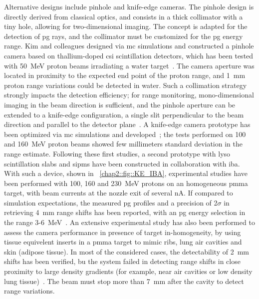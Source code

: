 Alternative designs include pinhole and knife-edge cameras. The pinhole design is directly derived from classical optics, and consists in a thick collimator with a tiny hole, allowing for two-dimensional imaging. The concept is adapted for the detection of \gls{pg} rays, and the collimator must be customized for the \gls{pg} energy range. Kim and colleagues designed via \gls{mc} simulations and constructed a pinhole camera based on thallium-doped \gls{csi} scintillation detectors, which has been tested with 50~MeV proton beams irradiating a water target~\parencite{Kim2009}. The camera aperture was located in proximity to the expected end point of the proton range, and 1~mm proton range variations could be detected in water. Such a collimation strategy strongly impacts the detection efficiency; for range monitoring, mono-dimensional imaging in the beam direction is sufficient, and the pinhole aperture can be extended to a knife-edge configuration, a single slit perpendicular to the beam direction and parallel to the detector plane~\parencite{Bom2012}. A knife-edge camera prototype has been optimized via \gls{mc} simulations and developed~\parencite{Smeets2012}; the tests performed on 100 and 160~MeV proton beams showed few millimeters standard deviation in the range estimate. Following these first studies, a second prototype with \gls{lyso} scintillation slabs and \glspl{sipm} have been constructed in collaboration with \gls{iba}. With such a device, shown in \figurename~\ref{chap2::fig::KE_IBA}, experimental studies have been performed with 100, 160 and 230~MeV protons on an homogeneous \gls{pmma} target, with beam currents at the nozzle exit of several nA. If compared to simulation expectations, the measured \gls{pg} profiles and a precision of 2$\sigma$ in retrieving 4~mm range shifts has been reported, with an \gls{pg} energy selection in the range 3-6~MeV~\parencite{Perali2014}. An extensive experimental study has also been performed to assess the camera performance in presence of target in-homogeneity, by using tissue equivelent inserts in a \gls{pmma} target to mimic ribs, lung air cavities and skin (adipose tissue). In most of the considered cases, the detectability of 2~mm shifts has been verified, bu the system failed in detecting range shifts in close proximity to large density gradients (for example, near air cavities or low density lung tissue)~\parencite{Priegnitz2015}. The beam must stop more than 7~mm after the cavity to detect range variations.   

